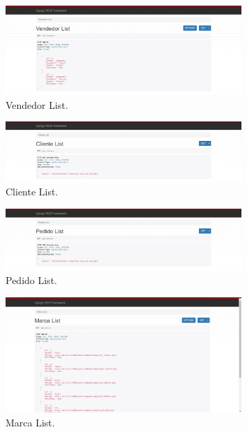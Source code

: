 \documentclass{article}
\begin{document}
    \begin{figure}[H]
		\centering
        \includegraphics[width=0.8\textwidth,keepaspectratio]{img/b1.jpeg}
		\caption{Vendedor List.}
    \end{figure}
    \begin{figure}[H]
		\centering
        \includegraphics[width=0.8\textwidth,keepaspectratio]{img/b2.jpeg}
		\caption{Cliente List.}
    \end{figure}
    \begin{figure}[H]
		\centering
        \includegraphics[width=0.8\textwidth,keepaspectratio]{img/b3.jpeg}
		\caption{Pedido List.}
    \end{figure}
    \begin{figure}[H]
		\centering
        \includegraphics[width=0.8\textwidth,keepaspectratio]{img/b4.jpeg}
		\caption{Marca List.}
    \end{figure}
\end{document}
